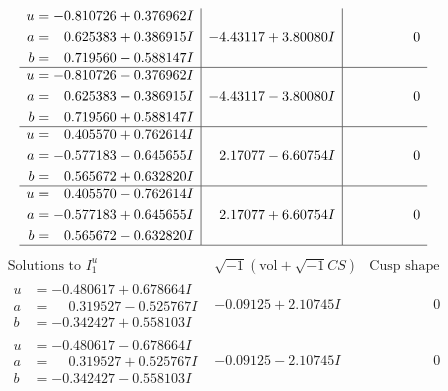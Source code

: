 \documentclass[1p]{elsarticle_modified}
\theoremstyle{definition}
\newcommand{\I}{\sqrt{-1}}
\begin{document}
$$\begin{array}{c|c|c}
\begin{aligned}
u &= -0.810726 + 0.376962 I \\
a &= \phantom{-}0.625383 + 0.386915 I \\
b &= \phantom{-}0.719560 - 0.588147 I\end{aligned}
 & -4.43117 + 3.80080 I & \phantom{-0.000000 } 0 \\ \hline\begin{aligned}
u &= -0.810726 - 0.376962 I \\
a &= \phantom{-}0.625383 - 0.386915 I \\
b &= \phantom{-}0.719560 + 0.588147 I\end{aligned}
 & -4.43117 - 3.80080 I & \phantom{-0.000000 } 0 \\ \hline\begin{aligned}
u &= \phantom{-}0.405570 + 0.762614 I \\
a &= -0.577183 - 0.645655 I \\
b &= \phantom{-}0.565672 + 0.632820 I\end{aligned}
 & \phantom{-}2.17077 - 6.60754 I & \phantom{-0.000000 } 0 \\ \hline\begin{aligned}
u &= \phantom{-}0.405570 - 0.762614 I \\
a &= -0.577183 + 0.645655 I \\
b &= \phantom{-}0.565672 - 0.632820 I\end{aligned}
 & \phantom{-}2.17077 + 6.60754 I & \phantom{-0.000000 } 0\\
 \hline 
 \end{array}$$\newpage$$\begin{array}{c|c|c}  
\text{Solutions to }I^u_{1}& \I (\text{vol} + \sqrt{-1}CS) & \text{Cusp shape}\\
 \hline 
\begin{aligned}
u &= -0.480617 + 0.678664 I \\
a &= \phantom{-}0.319527 - 0.525767 I \\
b &= -0.342427 + 0.558103 I\end{aligned}
 & -0.09125 + 2.10745 I & \phantom{-0.000000 } 0 \\ \hline\begin{aligned}
u &= -0.480617 - 0.678664 I \\
a &= \phantom{-}0.319527 + 0.525767 I \\
b &= -0.342427 - 0.558103 I\end{aligned}
 & -0.09125 - 2.10745 I & \phantom{-0.000000 } 0 \\ \hline\begin{aligned}

\end{aligned}
\end{array}$$
\end{document}
